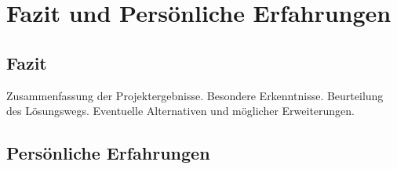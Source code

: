 



\chapter{Fazit und Persönliche Erfahrungen}


\section{Fazit}

Zusammenfassung der Projektergebnisse. 
Besondere Erkenntnisse. Beurteilung des Lösungswegs. Eventuelle Alternativen und möglicher Erweiterungen.

\section{Persönliche Erfahrungen}


